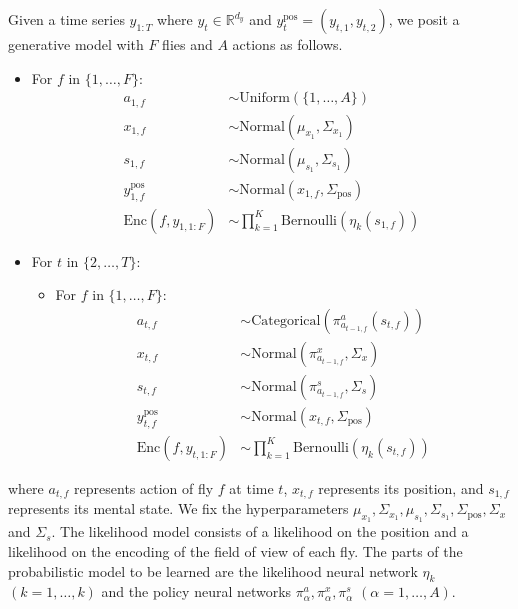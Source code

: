 \documentclass{article}
\begin{document}
Given a time series $y_{1:T}$ where $y_t \in \mathbb R^{d_y}$ and $y_t^{\text{pos}} = (y_{t, 1}, y_{t, 2})$, we posit a generative model with $F$ flies and $A$ actions as follows.
\begin{itemize}
    \item For $f$ in $\{1, \dotsc, F\}$:
    \begin{align}
        a_{1, f} &\sim \mathrm{Uniform}(\{1, \dotsc, A\}) \\
        x_{1, f} &\sim \mathrm{Normal}(\mu_{x_1}, \Sigma_{x_1}) \\
        s_{1, f} &\sim \mathrm{Normal}(\mu_{s_1}, \Sigma_{s_1}) \\
        y_{1, f}^{\text{pos}} &\sim \mathrm{Normal}(x_{1, f}, \Sigma_{\text{pos}}) \\
        \mathrm{Enc}(f, y_{1, 1:F}) &\sim \prod_{k = 1}^K \mathrm{Bernoulli}(\eta_k(s_{1, f}))
    \end{align}
    \item For $t$ in $\{2, \dotsc, T\}$:
    \begin{itemize}
        \item For $f$ in $\{1, \dotsc, F\}$:
        \begin{align}
            a_{t, f} &\sim \mathrm{Categorical}(\pi_{a_{t - 1, f}}^a(s_{t, f})) \\
            x_{t, f} &\sim \mathrm{Normal}(\pi_{a_{t - 1, f}}^x, \Sigma_x) \\
            s_{t, f} &\sim \mathrm{Normal}(\pi_{a_{t - 1, f}}^s, \Sigma_s) \\
            y_{t, f}^{\text{pos}} &\sim \mathrm{Normal}(x_{t, f}, \Sigma_{\text{pos}}) \\
            \mathrm{Enc}(f, y_{t, 1:F}) &\sim \prod_{k = 1}^K \mathrm{Bernoulli}(\eta_k(s_{t, f}))
        \end{align}
    \end{itemize}
\end{itemize}
where $a_{t, f}$ represents action of fly $f$ at time $t$, $x_{t, f}$ represents its position, and $s_{1, f}$ represents its mental state.
We fix the hyperparameters $\mu_{x_1}, \Sigma_{x_1}, \mu_{s_1}, \Sigma_{s_1}, \Sigma_{\text{pos}}, \Sigma_x$ and $\Sigma_s$.
The likelihood model consists of a likelihood on the position and a likelihood on the encoding of the field of view of each fly.
The parts of the probabilistic model to be learned are the likelihood neural network $\eta_k$ $(k = 1, \dotsc, k)$ and the policy neural networks $\pi_\alpha^a, \pi_\alpha^x, \pi_\alpha^s$ $(\alpha = 1, \dotsc, A)$.
\end{document}
